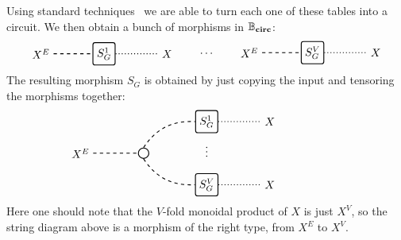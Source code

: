 %
Using standard techniques~\cite{Vollmer1999} we are able to turn each one of 
these tables into a circuit. We then obtain a bunch 
of morphisms in $\mathbb{B}_\textbf{circ}$:
%
%
\begin{equation*}
  \begin{tikzpicture}[baseline=0pt]
    \node[draw, minimum height=20, minimum width=20, rounded corners=2, thick] (S) at (0,0) {$S_G^1$};

    \node (Xe) at (-2,0) {$X^E$};
    \node (Xv) at (2,0) {$X$};

    \draw[-, dashed,thick] (Xe) to (S.west);
    \draw[-, dotted, thick] (S.east) to (Xv);
  \end{tikzpicture}
  \qquad \dots \qquad
  \begin{tikzpicture}[baseline=-1pt]
    \node[draw, minimum height=20, minimum width=20, rounded corners=2, thick] (S) at (0,0) {$S_G^V$};

    \node (Xe) at (-2,0) {$X^E$};
    \node (Xv) at (2,0) {$X$};

    \draw[-, dashed, thick] (Xe) to (S.west);
    \draw[-, dotted, thick] (S.east) to (Xv);
  \end{tikzpicture}
\end{equation*}
% 
The resulting morphism $S_G$ is obtained by just copying the 
input and tensoring the morphisms together:
%
%
\begin{equation*}
  \begin{tikzpicture}
    \node at (4.25,0) {};
    \node[draw, minimum height=20, minimum width=20, rounded corners=2, thick] (SV) at (0,-1) {$S_G^V$};
    \node[thick] (Sdots) at (0,0.15)  {$\vdots$};
    \node[draw, minimum height=20, minimum width=20, rounded corners=2, thick] (S1) at (0,1)  {$S_G^1$};
    \node[draw, circle, radius=5pt, thick] (copy) at (-2,0) {};

    \node (XeV) at (-4,0) {$X^E$};

    \node (XvV) at (2,-1) {$X$};
    \node (Xv1) at (2,1) {$X$};

    \draw[-, dashed, thick] (XeV) to (copy.west);
    \draw[bend left, dashed, thick] (copy.north) to (S1.west);
    \draw[bend right, dashed, thick] (copy.south) to (SV.west);

    \draw[-, dotted, thick] (SV.east) to (XvV);
    \draw[-, dotted, thick] (S1.east) to (Xv1);
  \end{tikzpicture}
\end{equation*}
%
Here one should note that the $V$-fold monoidal product of $X$ is 
just $X^V$, so the string diagram above is a morphism of the right type, from 
$X^E$ to $X^V$.

